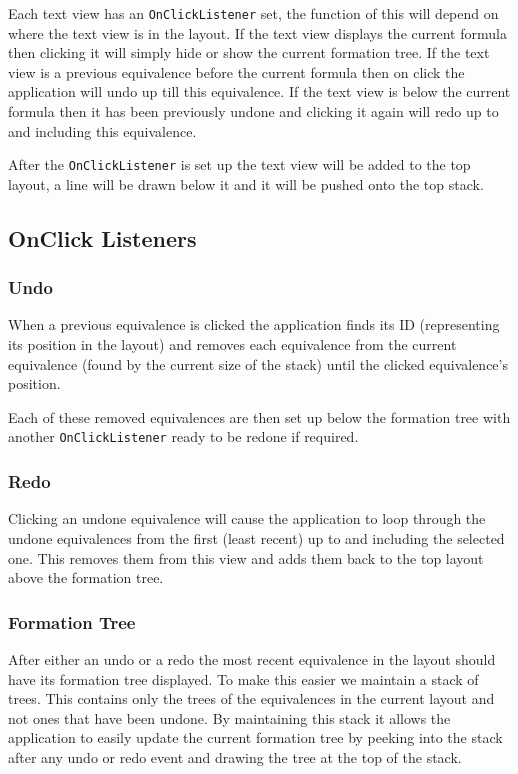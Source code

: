 \documentclass[draft]{report}
\begin{document}
Each text view has an {\tt OnClickListener} set, the function of this will depend on where the text view is in the layout. If the text view displays the current formula then clicking it will simply hide or show the current formation tree. If the text view is a previous equivalence before the current formula then on click the application will undo up till this equivalence. If the text view is below the current formula then it has been previously undone and clicking it again will redo up to and including this equivalence.

After the {\tt OnClickListener} is set up the text view will be added to the top layout, a line will be drawn below it and it will be pushed onto the top stack.

\subsection{OnClick Listeners}

\subsubsection{Undo}

When a previous equivalence is clicked the application finds its ID (representing its position in the layout) and removes each equivalence from the current equivalence (found by the current size of the stack) until the clicked equivalence's position. 

Each of these removed equivalences are then set up below the formation tree with another {\tt OnClickListener} ready to be redone if required.

\subsubsection{Redo}

Clicking an undone equivalence will cause the application to loop through the undone equivalences from the first (least recent) up to and including the selected one. This removes them from this view and adds them back to the top layout above the formation tree. 

\subsubsection{Formation Tree}

After either an undo or a redo the most recent equivalence in the layout should have its formation tree displayed. To make this easier we maintain a stack of trees. This contains only the trees of the equivalences in the current layout and not ones that have been undone. By maintaining this stack it allows the application to easily update the current formation tree by peeking into the stack after any undo or redo event and drawing the tree at the top of the stack.
\end{document}
